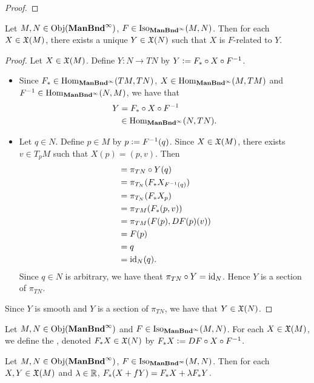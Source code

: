 \documentclass{book}
\begin{document}
\begin{proof}
\end{proof}

\begin{ex}
	Let $M, N \in \operatorname{Obj}(\operatorname*{\text{\textbf{ManBnd}}^{\infty}})$, $F \in \operatorname{Iso}_{\operatorname*{\text{\textbf{ManBnd}}^{\infty}}}(M, N)$. Then for each $X \in \mathfrak{X}(M)$, there exists a unique $Y \in \mathfrak{X}(N)$ such that $X$ is $F$-related to $Y$. 
\end{ex}

\begin{proof}
	Let $X \in \mathfrak{X}(M)$. Define $Y: N \rightarrow TN$ by $Y \vcentcolon= F_* \circ X \circ F^{-1}$.
	\begin{itemize}
		\item 
		Since $F_* \in \operatorname{Hom}_{\operatorname*{\text{\textbf{ManBnd}}^{\infty}}}(TM, TN)$, $X \in \operatorname{Hom}_{\operatorname*{\text{\textbf{ManBnd}}^{\infty}}}(M, TM)$ and $F^{-1} \in \operatorname{Hom}_{\operatorname*{\text{\textbf{ManBnd}}^{\infty}}}(N, M)$, we have that 
		\begin{align*}
			Y
			& = F_* \circ X \circ F^{-1} \\
			& \in \operatorname{Hom}_{\operatorname*{\text{\textbf{ManBnd}}^{\infty}}}(N, TN).
		\end{align*}
		\item 
		Let $q \in N$. Define $p \in M$ by $p \vcentcolon= F^{-1}(q)$. Since $X \in \mathfrak{X}(M)$, there exists $v \in T_{p}M$ such that $X(p) = (p, v)$. Then 
		\begin{align*}
			& = \pi_{TN} \circ Y(q) \\
			& = \pi_{T_N}(F_*X_{F^{-1}(q)}) \\
			& = \pi_{T_N}(F_*X_p) \\
			& = \pi_{TM}(F_*(p, v)) \\
			& = \pi_{TM}(F(p), DF(p)(v)) \\
			& = F(p) \\
			& = q \\
			& = \operatorname{id}_N(q).
		\end{align*}
		Since $q \in N$ is arbitrary, we have theat $\pi_{TN} \circ Y = \operatorname{id}_N$. Hence $Y$ is a section of $\pi_{TN}$.
	\end{itemize}
	Since $Y$ is smooth and $Y$ is a section of $\pi_{TN}$, we have that $Y \in \mathfrak{X}(N)$.
\end{proof}

\begin{defn}
	Let $M, N \in \operatorname{Obj}(\operatorname*{\text{\textbf{ManBnd}}^{\infty}})$ and $F \in \operatorname{Iso}_{\operatorname*{\text{\textbf{ManBnd}}^{\infty}}}(M, N)$. For each $X \in \mathfrak{X}(M)$, we define the , denoted $F_*X \in \mathfrak{X}(N)$ by $F_*X \vcentcolon= DF \circ X \circ F^{-1}$.
\end{defn}

\begin{ex}
	Let $M, N \in \operatorname{Obj}(\operatorname*{\text{\textbf{ManBnd}}^{\infty}})$, $F \in \operatorname{Iso}_{\operatorname*{\text{\textbf{ManBnd}}^{\infty}}}(M, N)$. Then for each $X, Y \in \mathfrak{X}(M)$ and $\lambda \in \mathbb{R}$, $F_*(X + f Y) = F_*X + \lambda F_*Y$.
\end{ex}
\end{document}
